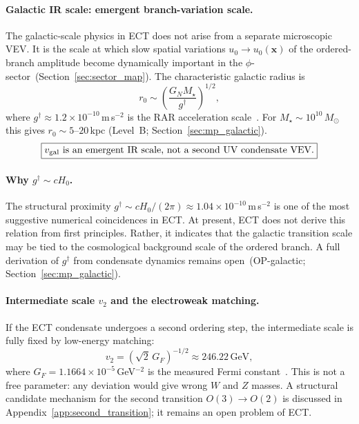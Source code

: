 \documentclass[11pt,a4paper]{article}
\numberwithin{equation}{section}
\begin{document}
\paragraph{Galactic IR scale: emergent branch-variation scale.}
The galactic-scale physics in ECT does not arise from a separate
microscopic VEV.
It is the scale at which slow spatial variations
$u_0\to u_0(\mathbf{x})$ of the ordered-branch amplitude become
dynamically important in the $\phi$-sector~(Section~\ref{sec:sector_map}).
The characteristic galactic radius is
\begin{equation}
  r_0 \sim \left(\frac{G_N M_\star}{g^\dagger}\right)^{1/2},
  \label{eq:r0_gal}
\end{equation}
where $g^\dagger\approx1.2\times10^{-10}$\,m\,s$^{-2}$ is
the RAR acceleration scale~\cite{McGaugh2016}.
For $M_\star\sim10^{10}\,M_\odot$ this gives $r_0\sim5$--$20$\,kpc
(Level~B; Section~\ref{sec:mp_galactic}).
\begin{equation}
  \boxed{v_{\rm gal} \text{ is an emergent IR scale, not a second UV condensate VEV.}}
\end{equation}

\paragraph{Why $g^\dagger\sim cH_0$.}
The structural proximity $g^\dagger\sim cH_0/(2\pi)\approx
1.04\times10^{-10}$\,m\,s$^{-2}$ is one of the most suggestive
numerical coincidences in ECT.
At present, ECT does not derive this relation from first principles.
Rather, it indicates that the galactic transition scale may be tied to
the cosmological background scale of the ordered branch.
A full derivation of $g^\dagger$ from condensate dynamics remains
open~(OP-galactic; Section~\ref{sec:mp_galactic}).

\paragraph{Intermediate scale $v_2$ and the electroweak matching.}
If the ECT condensate undergoes a second ordering step, the
intermediate scale is fully fixed by low-energy matching:
\begin{equation}
  v_2 = \left(\sqrt{2}\,G_F\right)^{-1/2}
  \approx 246.22\,\text{GeV},
  \label{eq:v2_GF}
\end{equation}
where $G_F=1.1664\times10^{-5}$\,GeV$^{-2}$
is the measured Fermi constant~\cite{ParticleDataGroup2022}.
This is not a free parameter: any deviation would give wrong
$W$ and $Z$ masses. A structural candidate mechanism for the
second transition $O(3)\to O(2)$ is discussed in
Appendix~\ref{app:second_transition}; it remains an open
problem of ECT.
\end{document}
